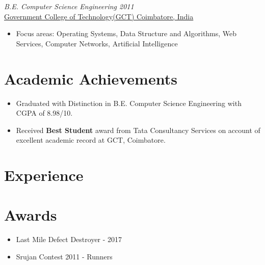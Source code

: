 \documentclass[10pt]{article}
\begin{document}
\begin{minipage}[t]{0.40\textwidth}
{\sl B.E. Computer Science Engineering 2011} \hfill \\
\href{https://gct.ac.in/}{Government College of Technology(GCT) Coimbatore, India}
\begin{itemize}
\item Focus areas: Operating Systems, Data Structure and Algorithms, Web Services, Computer Networks, Artificial Intelligence
\end{itemize} 

\section*{Academic Achievements}
\begin{itemize}
\item Graduated with Distinction in B.E. Computer Science Engineering with CGPA of 8.98/10.
\item Received {\bf Best Student} award from Tata Consultancy Services on account of excellent academic record at GCT, Coimbatore.
\end{itemize}
\end{minipage}
\hfill
\begin{minipage}[t]{0.66\textwidth}
\vspace{10pt}
\section*{Experience}

\section*{Awards}
\begin{itemize}
\item Last Mile Defect Destroyer - 2017
\item Srujan Contest 2011 - Runners
\end{itemize}
\end{minipage}
\end{document}
